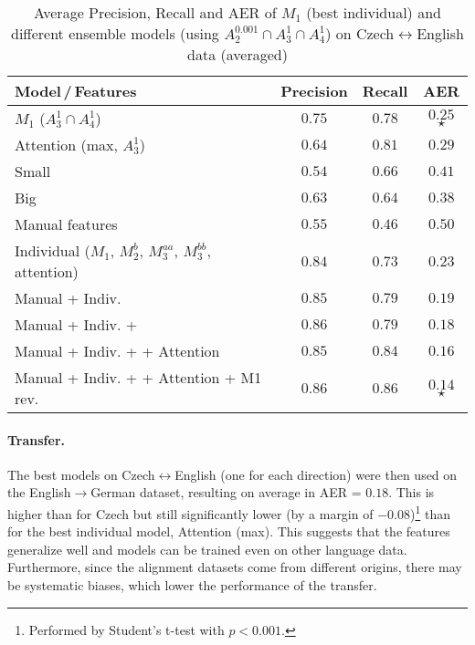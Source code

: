 \newcommand{\staroff}{\hspace{0.02cm}$\star$\hspace*{-0.28cm}}
\begin{table*}[h!]
    \center
    \begin{tabular}{lccc}
        \toprule
        Model\,/\,Features & Precision & Recall & AER \\
        \midrule
        $M_1$ ($A_3^{1} \cap A_4^{1}$) & $0.75$ & $0.78$ & $0.25$ \staroff \\
        Attention (max, $A_3^1$) & $0.64$ & $0.81$ & $0.29$ \\
        \fastalign{} Small & $0.54$ & $0.66$ & $0.41$ \\
        \fastalign{} Big & $0.63$ & $0.64$ & $0.38$ \\
        \midrule
        Manual features & $0.55$ & $0.46$ & $0.50$ \\
        Individual ($M_1$, $M_2^b$, $M_3^{aa}$, $M_3^{bb}$, attention) &  $0.84$ & $0.73$ & $0.23$ \\
        Manual + Indiv. & $0.85$ & $0.79$ & $0.19$ \\
        Manual + Indiv. + \fastalign{} & $0.86$ & $0.79$ & $0.18$ \\
        Manual + Indiv. + \fastalign{} + Attention & $0.85$ & $0.84$ & $0.16$ \\
        Manual + Indiv. + \fastalign{} + Attention + M1 rev. \hspace*{-0.4cm} & $0.86$ & $0.86$ & $0.14$ \staroff \\
        \bottomrule
    \end{tabular}
    \caption{Average Precision, Recall and AER of $M_1$ (best individual) and different ensemble models (using $A_2^{0.001} \cap A_3^{1} \cap A_4^{1}$) on Czech$\leftrightarrow$English data (averaged) \label{tab:ensemble_performance}}
\end{table*}

\vspace{-0.2cm}
\paragraph{Transfer.} The best models on Czech$\leftrightarrow$English (one for each direction) were then used on the English$\rightarrow$German dataset, resulting on average in AER = $0.18$. This is higher than for Czech but still significantly lower (by a margin of $-0.08$)\footnote{Performed by Student's t-test with $p<0.001$.} than for the best individual model, Attention (max). This suggests that the features generalize well and models can be trained even on other language data. Furthermore, since the alignment datasets come from different origins, there may be systematic biases, which lower the performance of the transfer.